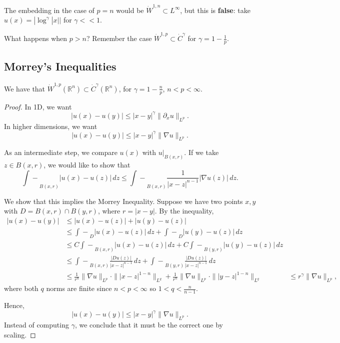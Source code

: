 \documentclass[12pt]{scrartcl}
\newcommand{\R}{\mathbb{R}}
\newcommand{\aint}{\mathrel{\int\!\!\!\!\!\!-}}
\let \grad \nabla
\begin{document}
The embedding in the case of $p = n$ would be $\dot{W}^{1, n} \subset L^{\infty}$, but this is \textbf{false}: take $u(x) = |\log^\gamma |x||$ for $\gamma << 1$. 

What happens when $p > n$?  Remember the case $\dot{W}^{1,p} \subset \dot{C}^{\gamma}$ for $\gamma = 1 - \frac{1}{p}.$

\subsection{Morrey's Inequalities}
\begin{thm}[Morrey] We have that $\dot{W}^{1, p}(\R^n) \subset \dot{C}^{\gamma}(\R^n)$, for $\gamma = 1 - \frac{n}{p}$, $n < p < \infty.$
\end{thm}
\begin{proof}
In 1D, we want $$|u(x) - u(y)| \le |x-y|^{\gamma} \|\partial_x u\|_{L^p}.$$
In higher dimensions, we want 
$$|u(x) - u(y)| \le |x-y|^{\gamma} \| \nabla u \|_{L^p}.$$

As an intermediate step, we compare $u(x)$ with $u\vert_{B(x, r)}$.  If we take $z \in B(x, r)$, we would like to show that 
$$\mathrel{\int\!\!\!\!\!\!-}_{B(x, r)}|u(x) - u(z)|\,dz \le \mathrel{\int\!\!\!\!\!\!-}_{B(x, r)}\frac{1}{|x-z|^{n-1}}|\grad u(z)|\, dz.$$

We show that this implies the Morrey Inequality.  Suppose we have two points $x, y$ with $D = B(x, r) \cap B(y, r)$, where $r = |x- y|$.  By the inequality,
\begin{align*}
|u(x) - u(y)| &\le |u(x) - u(z)| + |u(y) - u(z)| \\
&\le  \aint_D |u(x) - u(z)|\,dz + \aint_D |u(y) - u(z)|\, dz \\
&\le C\aint_{B(x, r)} |u(x) - u(z)|\,dz + C\aint_{B(y, r)} |u(y) - u(z)|\,dz \\
& \le \aint_{B(x, r)} \frac{|Du(z)|}{|x-z|^{n-1}}\, dz + \aint_{B(y, r)} \frac{|Du(z)|}{|x-z|^{n-1}}\, dz  \\
&\le \frac{1}{r^n}\|\grad u\|_{L^p} \cdot \||x-z|^{1-n}\|_{L^q} + \frac{1}{r^n}\|\grad u\|_{L^p} \cdot \||y-z|^{1-n}\|_{L^q}
&\le r^{\gamma}\|\grad u\|_{L^p},
\end{align*}
where both $q$ norms are finite since $n < p < \infty$ so $1 < q < \frac{n}{n-1}$.

Hence,
$$|u(x) - u(y)| \le |x-y|^{\gamma} \|\grad u\|_{L^p}.$$
Instead of computing $\gamma$, we conclude that it must be the correct one by scaling.  



\end{proof}
\end{document}
